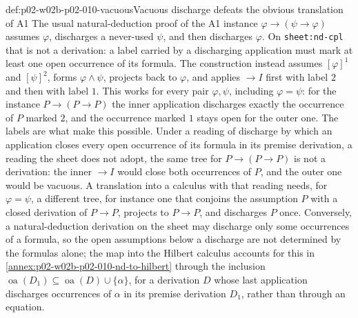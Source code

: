 \begin{hbwarning}{def:p02-w02b-p02-010-vacuous}{Vacuous discharge defeats the obvious translation of A1}
The usual natural-deduction proof of the A1 instance
\(\varphi\to(\psi\to\varphi)\) assumes \(\varphi\), discharges a never-used
\(\psi\), and then discharges \(\varphi\).  On
\texttt{sheet:\allowbreak nd-cpl} that is not a derivation: a label carried
by a discharging application must mark at least one open occurrence of its
formula.  The construction instead assumes \([\varphi]^1\) and
\([\psi]^2\), forms \(\varphi\land\psi\), projects back to \(\varphi\), and
applies \(\to I\) first with label \(2\) and then with label \(1\).  This
works for every pair \(\varphi,\psi\), including \(\varphi=\psi\): for the
instance \(P\to(P\to P)\) the inner application discharges exactly the
occurrence of \(P\) marked \(2\), and the occurrence marked \(1\) stays open
for the outer one.  The labels are what make this possible.  Under a
reading of discharge by which an application closes every open occurrence
of its formula in its premise derivation, a reading the sheet does not
adopt, the same tree for \(P\to(P\to P)\) is not a derivation: the inner
\(\to I\) would close both occurrences of \(P\), and the outer one would be
vacuous.  A translation into a calculus with that reading needs, for
\(\varphi=\psi\), a different tree, for instance one that conjoins the
assumption \(P\) with a closed derivation of \(P\to P\), projects to
\(P\to P\), and discharges \(P\) once.  Conversely, a natural-deduction
derivation on the sheet may discharge only some occurrences of a formula,
so the open assumptions below a discharge are not determined by the
formulas alone; the map into the Hilbert calculus accounts for this in
\cref{annex:p02-w02b-p02-010-nd-to-hilbert} through the inclusion
\(\operatorname{oa}(D_1)\subseteq\operatorname{oa}(D)\cup\{\alpha\}\), for
a derivation \(D\) whose last application discharges occurrences of
\(\alpha\) in its premise derivation \(D_1\), rather than through an
equation.
\end{hbwarning}

